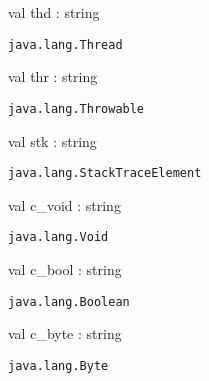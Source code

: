 \documentclass[11pt]{article}
\begin{document}
\begin{ocamldocsigend}
\begin{ocamldocdescription}
\end{ocamldocdescription}


\label{val:Java.Lang.thd}\begin{ocamldoccode}
val thd : string
\end{ocamldoccode}
\begin{ocamldocdescription}
{\tt{java.lang.Thread}}


\end{ocamldocdescription}


\label{val:Java.Lang.thr}\begin{ocamldoccode}
val thr : string
\end{ocamldoccode}
\begin{ocamldocdescription}
{\tt{java.lang.Throwable}}


\end{ocamldocdescription}


\label{val:Java.Lang.stk}\begin{ocamldoccode}
val stk : string
\end{ocamldoccode}
\begin{ocamldocdescription}
{\tt{java.lang.StackTraceElement}}


\end{ocamldocdescription}


\label{val:Java.Lang.c-underscorevoid}\begin{ocamldoccode}
val c_void : string
\end{ocamldoccode}
\begin{ocamldocdescription}
{\tt{java.lang.Void}}


\end{ocamldocdescription}


\label{val:Java.Lang.c-underscorebool}\begin{ocamldoccode}
val c_bool : string
\end{ocamldoccode}
\begin{ocamldocdescription}
{\tt{java.lang.Boolean}}


\end{ocamldocdescription}


\label{val:Java.Lang.c-underscorebyte}\begin{ocamldoccode}
val c_byte : string
\end{ocamldoccode}
\begin{ocamldocdescription}
{\tt{java.lang.Byte}}



\end{ocamldocdescription}
\end{ocamldocsigend}
\end{document}
